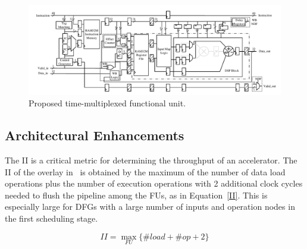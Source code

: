 \begin{figure}[!tb]
	\centering
	\includegraphics[trim={1cm 0.5cm 1cm 1cm},width=14cm]{figures/FU_WB_new_1.pdf}
	\caption{Proposed time-multiplexed functional unit.}
	\label{fu}
\end{figure}

\subsection{Architectural Enhancements}
The II is a critical metric for determining the throughput of an accelerator.
The II of the overlay in~\cite{li2016area} is obtained by the maximum of the number of data load operations plus the number of execution operations with 2 additional clock cycles needed to flush the pipeline among the FUs, as in Equation~\ref{II}.
This is especially large for DFGs with a large number of inputs and operation nodes in the first scheduling stage.

\begin{equation}
	II =  \max_{FU} \{\#load + \#op + 2\}
	\label{II}
\end{equation}


